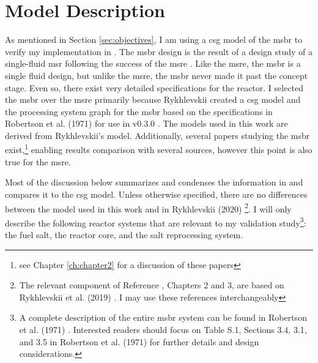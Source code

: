 \chapter{Model Description}
\label{ch:chapter4}
\glsresetall
As mentioned in Section \ref{sec:objectives}, I am using a \gls{csg} model of
the \Gls{msbr} \cite{robertson_conceptual_1971} to verify my \OpenMC
implementation in \SaltProc. The \Gls{msbr} design is the result of a
design study of a single-fluid \gls{msr} following the success of the \Gls{msre}
\cite{haubenreich_experience_1970} \cite{rosenthal_history_1970}. Like the \Gls{msre},
the \Gls{msbr} is a single fluid design, but unlike the \Gls{msre}, the \Gls{msbr}
never made it past the concept stage. Even so, there exist very detailed specifications for
the reactor. I selected the \Gls{msbr} over the \Gls{msre} primarily because
Rykhlevskii created a \SerpentTWO \Gls{csg} model and the processing
system graph for the \Gls{msbr} based on the specifications in
Robertson et al. (1971) \cite{robertson_conceptual_1971} for use in \SaltProc
v0.3.0 \cite{rykhlevskii_fuel_2020}. The models used in this work are derived
from Rykhlevskii's model. Additionally, several papers studying the
\Gls{msbr} exist,\footnote{see Chapter
\ref{ch:chapter2} for a discussion of these papers} enabling 
results comparison with several sources, however this point is
also true for the \Gls{msre}.

Most of the discussion below summarizes and condenses the information in
\cite{robertson_conceptual_1971} and compares it to the \Gls{csg} model. Unless otherwise
specified, there are no differences between the model used in this work and in
Rykhlevskii (2020) \cite{rykhlevskii_fuel_2020}\footnote{The relevant component of Reference
\cite{rykhlevskii_fuel_2020}, Chapters 2 and 3, are based on Rykhlevskii et al. (2019)
\cite{rykhlevskii_modeling_2019}. I may use these references interchangeably}. I
will only describe the following reactor systems that are relevant to my
validation study\footnote{A complete description of the entire \Gls{msbr} system
can be found in Robertson et al. (1971) \cite{robertson_conceptual_1971}.
Interested readers should focus on Table S.1, Sections 3.4, 3.1, and 3.5 in
Robertson et al. (1971) for further details and design considerations.}: the
fuel salt, the reactor core, and the salt reprocessing system.

